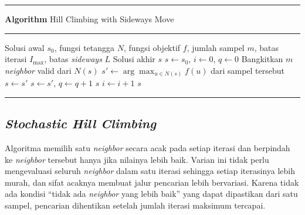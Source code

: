 \begingroup
\setlength{\parskip}{0pt}
\begin{list}{}{\setlength{\leftmargin}{0.1\linewidth}\setlength{\rightmargin}{0.1\linewidth}\setlength{\labelsep}{0pt}\setlength{\topsep}{0pt}\setlength{\partopsep}{0pt}\setlength{\parsep}{0pt}\setlength{\itemsep}{0pt}}\item[]
\noindent\rule{\linewidth}{0.8pt}\par\vspace{1pt}
\noindent{}\textbf{Algorithm \thealgorithm} Hill Climbing with Sideways Move\label{alg:sideways-hill-climbing}\par
\vspace{1pt}\noindent\rule{\linewidth}{0.4pt}\par\vspace{1pt}
\begin{algorithmic}
    \REQUIRE Solusi awal $s_0$, fungsi tetangga $N$, fungsi objektif $f$, jumlah sampel $m$, batas iterasi $I_{\max}$, batas \textit{sideways} $L$
    \ENSURE Solusi akhir $s$
    \STATE $s \gets s_0$, $i \gets 0$, $q \gets 0$
    \STATE Bangkitkan $m$ \textit{neighbor} valid dari $N(s)$
    \STATE $s' \gets \arg\max_{u \in N(s)} f(u)$ dari sampel tersebut
    \STATE $s \gets s'$
    \ELSE
    \STATE $s \gets s'$, $q \gets q+1$
    \ELSE
    \RETURN $s$
    \ENDIF
    \ENDIF
    \STATE $i \gets i+1$
    \ENDWHILE
    \RETURN $s$
\end{algorithmic}
\par\vspace{1pt}\noindent\rule{\linewidth}{0.8pt}
\end{list}
\endgroup

\subsection{\textit{Stochastic Hill Climbing}}
Algoritma memilih satu \textit{neighbor} secara acak pada setiap iterasi dan berpindah ke \textit{neighbor} tersebut hanya jika nilainya lebih baik. Varian ini tidak perlu mengevaluasi seluruh \textit{neighbor} dalam satu iterasi sehingga setiap iterasinya lebih murah, dan sifat acaknya membuat jalur pencarian lebih bervariasi. Karena tidak ada kondisi ``tidak ada \textit{neighbor} yang lebih baik'' yang dapat dipastikan dari satu sampel, pencarian dihentikan setelah jumlah iterasi maksimum tercapai.


